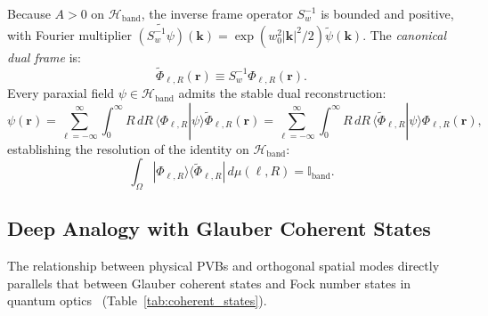 \documentclass{optica-article}
\begin{document}
Because $A > 0$ on $\mathcal{H}_{\text{band}}$, the inverse frame operator $S_w^{-1}$ is bounded and positive, with Fourier multiplier $\widetilde{(S_w^{-1} \psi)}(\mathbf{k}) = \exp(w_0^2 |\mathbf{k}|^2 / 2) \widetilde{\psi}(\mathbf{k})$. The \emph{canonical dual frame} is:
\begin{equation}
\widetilde{\Phi}_{\ell, R}(\mathbf{r}) \equiv S_w^{-1} \Phi_{\ell, R}(\mathbf{r}).
\label{eq:canonical_dual_def}
\end{equation}
Every paraxial field $\psi \in \mathcal{H}_{\text{band}}$ admits the stable dual reconstruction:
\begin{equation}
\boxed{\psi(\mathbf{r}) = \sum_{\ell=-\infty}^\infty \int_0^\infty R \, dR \, \langle \Phi_{\ell, R} | \psi \rangle \widetilde{\Phi}_{\ell, R}(\mathbf{r}) = \sum_{\ell=-\infty}^\infty \int_0^\infty R \, dR \, \langle \widetilde{\Phi}_{\ell, R} | \psi \rangle \Phi_{\ell, R}(\mathbf{r}),}
\label{eq:dual_expansion}
\end{equation}
establishing the resolution of the identity on $\mathcal{H}_{\text{band}}$:
\begin{equation}
\int_\Omega |\Phi_{\ell, R}\rangle \langle \widetilde{\Phi}_{\ell, R}| \, d\mu(\ell, R) = \mathbb{I}_{\text{band}}.
\label{eq:resolution_identity}
\end{equation}

\subsection{Deep Analogy with Glauber Coherent States}

The relationship between physical PVBs and orthogonal spatial modes directly parallels that between Glauber coherent states and Fock number states in quantum optics~\cite{Klauder1985,Perelomov1986} (Table~\ref{tab:coherent_states}).
\end{document}
